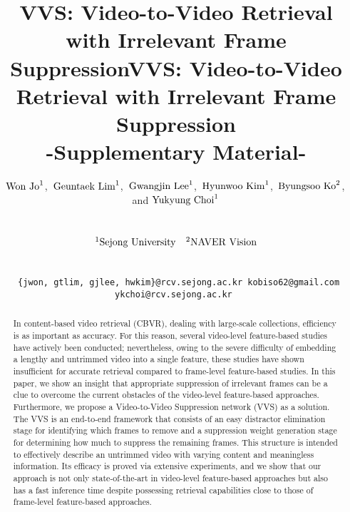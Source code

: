 \documentclass[10pt,twocolumn,letterpaper]{article}
\begin{document}
\title{VVS: Video-to-Video Retrieval with Irrelevant Frame Suppression}

\author{
\centerline{$\textup{Won Jo}^{1}$,\, $\textup{Geuntaek Lim}^{1}$,\, $\textup{Gwangjin Lee}^{1}$,\, $\textup{Hyunwoo Kim}^{1}$,\, $\textup{Byungsoo Ko}^{2}$,\, and $\textup{Yukyung Choi}^{1}$} \\
\normalsize\centerline{$^{1}\textup{Sejong University}$ \quad\, $^{2}\textup{NAVER Vision}$\hspace{28pt}} \\
\centerline{\tt\small \hspace{-19pt} \{jwon, gtlim, gjlee, hwkim\}@rcv.sejong.ac.kr \quad kobiso62@gmail.com \quad ykchoi@rcv.sejong.ac.kr }
}

\maketitle 

\title{VVS: Video-to-Video Retrieval with Irrelevant Frame Suppression\\ -Supplementary Material- \vspace{1cm}}
\author{}
\date{}

\ificcvfinal\thispagestyle{empty}\fi




\begin{abstract}
   In content-based video retrieval (CBVR), dealing with large-scale collections, efficiency is as important as accuracy. For this reason, several video-level feature-based studies have actively been conducted; nevertheless, owing to the severe difficulty of embedding a lengthy and untrimmed video into a single feature, these studies have shown insufficient for accurate retrieval compared to frame-level feature-based studies. In this paper, we show an insight that appropriate suppression of irrelevant frames can be a clue to overcome the current obstacles of the video-level feature-based approaches. Furthermore, we propose a Video-to-Video Suppression network (VVS) as a solution. The VVS is an end-to-end framework that consists of an easy distractor elimination stage for identifying which frames to remove and a suppression weight generation stage for determining how much to suppress the remaining frames. This structure is intended to effectively describe an untrimmed video with varying content and meaningless information. Its efficacy is proved via extensive experiments, and we show that our approach is not only state-of-the-art in video-level feature-based approaches but also has a fast inference time despite possessing retrieval capabilities close to those of frame-level feature-based approaches. 
\end{abstract}
\end{document}
